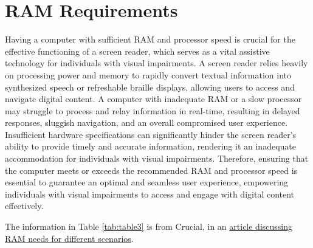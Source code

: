 \documentclass[14pt,letterpaper,twoside]{extreport}
\begin{document}
\pagebreak \hypertarget{ram-requirements}{}\section{RAM Requirements}\label{ram-requirements}
Having a computer with sufficient RAM and processor speed is crucial for the effective functioning of a screen reader, which serves as a vital assistive technology for individuals with visual impairments. A screen reader relies heavily on processing power and memory to rapidly convert textual information into synthesized speech or refreshable braille displays, allowing users to access and navigate digital content. A computer with inadequate RAM or a slow processor may struggle to process and relay information in real-time, resulting in delayed responses, sluggish navigation, and an overall compromised user experience. Insufficient hardware specifications can significantly hinder the screen reader's ability to provide timely and accurate information, rendering it an inadequate accommodation for individuals with visual impairments. Therefore, ensuring that the computer meets or exceeds the recommended RAM and processor speed is essential to guarantee an optimal and seamless user experience, empowering individuals with visual impairments to access and engage with digital content effectively.

The information in Table \ref{tab:table3} is from Crucial, in an \href{https://www.crucial.com/articles/about-memory/how-much-ram-does-my-computer-need}{article discussing RAM needs for different scenarios}.
\end{document}
